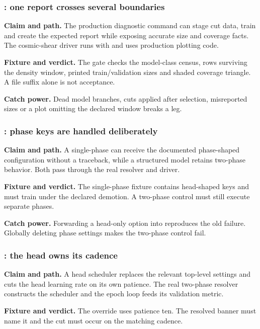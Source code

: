 \subsubsection{: one report crosses several boundaries}

\textbf{Claim and path.}  The production diagnostic command can stage cut
data, train and create the expected report while exposing accurate size and
coverage facts.  The cosmic-shear driver runs with  and
uses production plotting code.

\textbf{Fixture and verdict.}  The gate checks the model-class census, rows
surviving the density window, printed train/validation sizes and shaded
coverage triangle.  A file suffix alone is not acceptance.

\textbf{Catch power.}  Dead model branches, cuts applied after selection,
misreported sizes or a plot omitting the declared window breaks a leg.

\subsubsection{: phase keys are handled deliberately}

\textbf{Claim and path.}  A single-phase  can receive the
documented phase-shaped configuration without a traceback, while a structured
model retains two-phase behavior.  Both pass through the real resolver and
driver.

\textbf{Fixture and verdict.}  The single-phase fixture contains head-shaped
keys and must train under the declared demotion.  A two-phase control must
still execute separate phases.

\textbf{Catch power.}  Forwarding a head-only option into 
reproduces the old failure.  Globally deleting phase settings makes the
two-phase control fail.

\subsubsection{: the head owns its cadence}

\textbf{Claim and path.}  A head scheduler replaces the relevant top-level
settings and cuts the head learning rate on its own patience.  The real
two-phase resolver constructs the scheduler and the epoch loop feeds its
validation metric.

\textbf{Fixture and verdict.}  The override uses patience ten.  The resolved
banner must name it and the cut must occur on the matching cadence.

